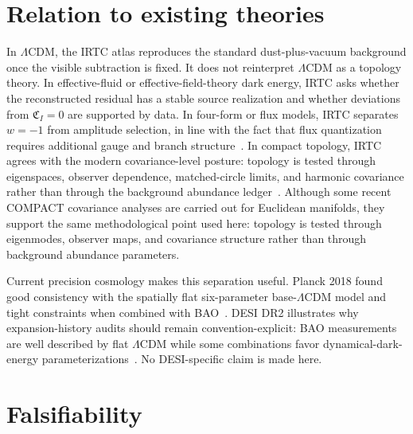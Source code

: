 \documentclass[
  aps,
  prd,
  reprint,
  superscriptaddress,
  floatfix,
  nofootinbib,
  longbibliography
]{revtex4-2}
\theoremstyle{plain}
\theoremstyle{definition}
\theoremstyle{remark}
\newcommand{\LCDM}{\Lambda\mathrm{CDM}}
\begin{document}
\section{Relation to existing theories}

In $\LCDM$, the IRTC atlas reproduces the standard dust-plus-vacuum background once the visible subtraction is fixed.  It does not reinterpret $\LCDM$ as a topology theory.  In effective-fluid or effective-field-theory dark energy, IRTC asks whether the reconstructed residual has a stable source realization and whether deviations from $\mathfrak C_I=0$ are supported by data.  In four-form or flux models, IRTC separates $w=-1$ from amplitude selection, in line with the fact that flux quantization requires additional gauge and branch structure~\cite{BrownTeitelboim1987,BoussoPolchinski2000}.  In compact topology, IRTC agrees with the modern covariance-level posture: topology is tested through eigenspaces, observer dependence, matched-circle limits, and harmonic covariance rather than through the background abundance ledger~\cite{Levin2002,Luminet2003,Aurich2005,Planck2015Topology,Saha2025Lens,Eskilt2024,Samandar2025}. Although some recent COMPACT covariance analyses are carried out for Euclidean manifolds, they support the same methodological point used here: topology is tested through eigenmodes, observer maps, and covariance structure rather than through background abundance parameters.

Current precision cosmology makes this separation useful.  Planck 2018 found good consistency with the spatially flat six-parameter base-$\LCDM$ model and tight constraints when combined with BAO~\cite{Planck2018Params}.  DESI DR2 illustrates why expansion-history audits should remain convention-explicit: BAO measurements are well described by flat $\LCDM$ while some combinations favor dynamical-dark-energy parameterizations~\cite{DESI2025DR2}.  No DESI-specific claim is made here.

\section{Falsifiability}
\end{document}
